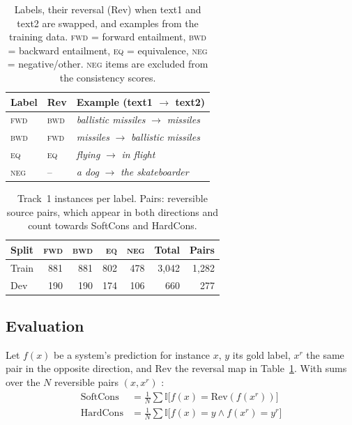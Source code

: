 \documentclass[11pt]{article}
\newcommand{\FWD}{\textsc{fwd}}
\newcommand{\BWD}{\textsc{bwd}}
\newcommand{\EQ}{\textsc{eq}}
\newcommand{\NEG}{\textsc{neg}}
\begin{document}
\begin{table}[t]
  \centering
  \small
  \begin{tabular}{@{}lll@{}}
    \toprule
    \textbf{Label} & \textbf{Rev} & \textbf{Example (text1 $\rightarrow$ text2)} \\
    \midrule
    \FWD & \BWD & \textit{ballistic missiles} $\rightarrow$ \textit{missiles} \\
    \BWD & \FWD & \textit{missiles} $\rightarrow$ \textit{ballistic missiles} \\
    \EQ  & \EQ  & \textit{flying} $\rightarrow$ \textit{in flight} \\
    \NEG & --   & \textit{a dog} $\rightarrow$ \textit{the skateboarder} \\
    \bottomrule
  \end{tabular}
  \caption{Labels, their reversal (Rev) when text1 and text2 are swapped, and examples from the training data. \FWD{} = forward entailment, \BWD{} = backward entailment, \EQ{} = equivalence, \NEG{} = negative/other. \NEG{} items are excluded from the consistency scores.}
  \label{tab:labels}
\end{table}

\begin{table}[t]
  \centering
  \small
  \begin{tabular}{@{}lrrrrrr@{}}
    \toprule
    \textbf{Split} & \FWD & \BWD & \EQ & \NEG & \textbf{Total} & \textbf{Pairs} \\
    \midrule
    Train & 881 & 881 & 802 & 478 & 3{,}042 & 1{,}282 \\
    Dev   & 190 & 190 & 174 & 106 & 660     & 277 \\
    \bottomrule
  \end{tabular}
  \caption{Track~1 instances per label. Pairs: reversible source pairs, which appear in both directions and count towards SoftCons and HardCons.}
  \label{tab:data}
\end{table}

\subsection{Evaluation}

Let $f(x)$ be a system's prediction for instance $x$, $y$ its gold label, $x^{r}$ the same pair in the opposite direction, and $\mathrm{Rev}$ the reversal map in Table~\ref{tab:labels}. With sums over the $N$ reversible pairs $(x, x^{r})$ \citep{dico-nli-2027-task}:
\begin{align}
  \mathrm{SoftCons} &= \frac{1}{N} \sum \mathbb{I}\big[ f(x) = \mathrm{Rev}(f(x^{r})) \big] \\
  \mathrm{HardCons} &= \frac{1}{N} \sum \mathbb{I}\big[ f(x) = y \wedge f(x^{r}) = y^{r} \big]
\end{align}
\end{document}
